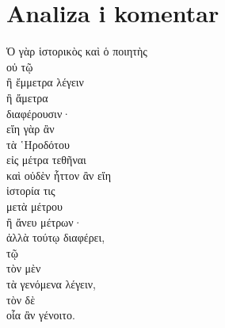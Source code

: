 \section*{Analiza i komentar}


{\large
\begin{greek}
\noindent Ὁ γὰρ ἱστορικὸς καὶ ὁ ποιητὴς \\
\tabto{2em} οὐ τῷ\\
\tabto{4em} ἢ ἔμμετρα λέγειν \\
\tabto{4em} ἢ ἄμετρα \\
\tabto{2em} διαφέρουσιν· \\
εἴη γὰρ ἂν \\
\tabto{2em} τὰ ῾Ηροδότου \\
\tabto{2em} εἰς μέτρα τεθῆναι \\
καὶ οὐδὲν ἧττον ἂν εἴη \\
\tabto{2em} ἱστορία τις \\
\tabto{4em} μετὰ μέτρου \\
\tabto{4em} ἢ ἄνευ μέτρων· \\
ἀλλὰ τούτῳ διαφέρει, \\
\tabto{2em} τῷ \\
\tabto{4em} τὸν μὲν \\
\tabto{6em} τὰ γενόμενα λέγειν, \\
\tabto{4em} τὸν δὲ \\
\tabto{6em} οἷα ἂν γένοιτο.\\

\end{greek}
}

